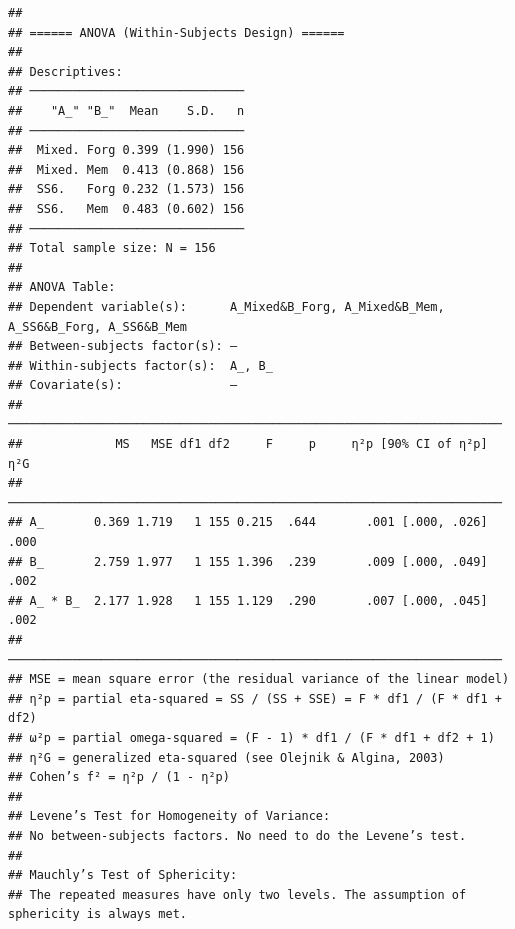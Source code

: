 \documentclass[
  man]{apa6}
\begin{document}
\begin{verbatim}
## 
## ====== ANOVA (Within-Subjects Design) ======
## 
## Descriptives:
## ──────────────────────────────
##    "A_" "B_"  Mean    S.D.   n
## ──────────────────────────────
##  Mixed. Forg 0.399 (1.990) 156
##  Mixed. Mem  0.413 (0.868) 156
##  SS6.   Forg 0.232 (1.573) 156
##  SS6.   Mem  0.483 (0.602) 156
## ──────────────────────────────
## Total sample size: N = 156
## 
## ANOVA Table:
## Dependent variable(s):      A_Mixed&B_Forg, A_Mixed&B_Mem, A_SS6&B_Forg, A_SS6&B_Mem
## Between-subjects factor(s): –
## Within-subjects factor(s):  A_, B_
## Covariate(s):               –
## ─────────────────────────────────────────────────────────────────────
##             MS   MSE df1 df2     F     p     η²p [90% CI of η²p]  η²G
## ─────────────────────────────────────────────────────────────────────
## A_       0.369 1.719   1 155 0.215  .644       .001 [.000, .026] .000
## B_       2.759 1.977   1 155 1.396  .239       .009 [.000, .049] .002
## A_ * B_  2.177 1.928   1 155 1.129  .290       .007 [.000, .045] .002
## ─────────────────────────────────────────────────────────────────────
## MSE = mean square error (the residual variance of the linear model)
## η²p = partial eta-squared = SS / (SS + SSE) = F * df1 / (F * df1 + df2)
## ω²p = partial omega-squared = (F - 1) * df1 / (F * df1 + df2 + 1)
## η²G = generalized eta-squared (see Olejnik & Algina, 2003)
## Cohen’s f² = η²p / (1 - η²p)
## 
## Levene’s Test for Homogeneity of Variance:
## No between-subjects factors. No need to do the Levene’s test.
## 
## Mauchly’s Test of Sphericity:
## The repeated measures have only two levels. The assumption of sphericity is always met.
\end{verbatim}
\end{document}
